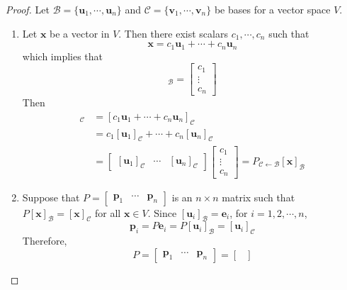 \begin{proof}
	Let $\mathcal{B} = \{ \textbf{u}_1, \cdots, \textbf{u}_n \}$ and $\mathcal{C} = \{ \textbf{v}_1, \cdots, \textbf{v}_n \}$ be bases for a vector space $V$.
	\begin{enumerate}
		\item Let $\textbf{x}$ be a vector in $V$. Then there exist scalars $c_1, \cdots, c_n$ such that \begin{equation*}
		\textbf{x} = c_1\textbf{u}_1 + \cdots + c_n\textbf{u}_n
		\end{equation*} which implies that \begin{equation*}
		[\textbf{x}]_\mathcal{B} = \begin{bmatrix}
		c_1 \\ \vdots \\ c_n
		\end{bmatrix}
		\end{equation*} Then \begin{align*}
		[\textbf{x}]_\mathcal{C} &= [c_1\textbf{u}_1 + \cdots + c_n\textbf{u}_n]_\mathcal{C} \\
		&= c_1[\textbf{u}_1]_\mathcal{C} + \cdots + c_n[\textbf{u}_n]_\mathcal{C} \\
		&= \begin{bmatrix}
		\left[\textbf{u}_1\right]_\mathcal{C} & \cdots & [\textbf{u}_n]_\mathcal{C}
		\end{bmatrix} \begin{bmatrix}
		c_1 \\ \vdots \\ c_n
		\end{bmatrix} = P_{ \mathcal{C} \leftarrow \mathcal{B} }[\textbf{x}]_\mathcal{B}
		\end{align*}
		\item Suppose that $P = \begin{bmatrix}
			\textbf{p}_1 & \cdots & \textbf{p}_n
		\end{bmatrix}$ is an $n \times n$ matrix such that $P[\textbf{x}]_\mathcal{B} = [\textbf{x}]_\mathcal{C}$ for all $\textbf{x} \in V$. Since $[\textbf{u}_i]_\mathcal{B} = \textbf{e}_i$, for $i = 1, 2, \cdots, n$, \begin{equation*}
			\textbf{p}_i = P\textbf{e}_i = P[\textbf{u}_i]_\mathcal{B} = [\textbf{u}_i]_\mathcal{C}
		\end{equation*} Therefore, \begin{equation*}
			P = \begin{bmatrix}
				\textbf{p}_1 & \cdots & \textbf{p}_n
			\end{bmatrix} = \begin{bmatrix}

\end{bmatrix}
\end{equation*}
\end{enumerate}
\end{proof}
